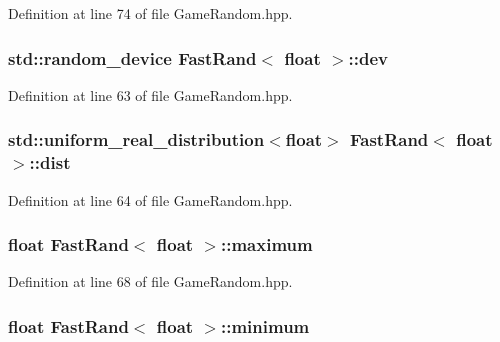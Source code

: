 Definition at line 74 of file Game\-Random.\-hpp.

\hypertarget{class_fast_rand_3_01float_01_4_a6df58e798e46b7e8a12abb8a2108a0d4}{
\subsubsection[{dev}]{\setlength{\rightskip}{0pt plus 5cm}std\-::random\-\_\-device {\bf Fast\-Rand}$<$ float $>$\-::dev\hspace{0.3cm}{\ttfamily [protected]}}}\label{class_fast_rand_3_01float_01_4_a6df58e798e46b7e8a12abb8a2108a0d4}


Definition at line 63 of file Game\-Random.\-hpp.

\hypertarget{class_fast_rand_3_01float_01_4_a55e3657b55f664dbe6139846a18b6d5b}{
\subsubsection[{dist}]{\setlength{\rightskip}{0pt plus 5cm}std\-::uniform\-\_\-real\-\_\-distribution$<$float$>$ {\bf Fast\-Rand}$<$ float $>$\-::dist\hspace{0.3cm}{\ttfamily [protected]}}}\label{class_fast_rand_3_01float_01_4_a55e3657b55f664dbe6139846a18b6d5b}


Definition at line 64 of file Game\-Random.\-hpp.

\hypertarget{class_fast_rand_3_01float_01_4_a3d2416ee22bca8371f35b24a16c65165}{
\subsubsection[{maximum}]{\setlength{\rightskip}{0pt plus 5cm}float {\bf Fast\-Rand}$<$ float $>$\-::maximum\hspace{0.3cm}{\ttfamily [protected]}}}\label{class_fast_rand_3_01float_01_4_a3d2416ee22bca8371f35b24a16c65165}


Definition at line 68 of file Game\-Random.\-hpp.

\hypertarget{class_fast_rand_3_01float_01_4_aa7c4d17d121e31bbc2b815f1f9a5b204}{
\subsubsection[{minimum}]{\setlength{\rightskip}{0pt plus 5cm}float {\bf Fast\-Rand}$<$ float $>$\-::minimum\hspace{0.3cm}{\ttfamily [protected]}}}\label{class_fast_rand_3_01float_01_4_aa7c4d17d121e31bbc2b815f1f9a5b204}


